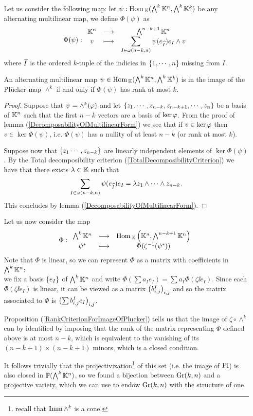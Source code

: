\noindent Let us consider the following map: let $\psi:\mathrm{Hom}\,_{\mathbb{K}}(\bigwedge^k\mathbb{K}^n,\bigwedge^k\mathbb{K}^k)$ be any alternating multilinear map, we define $\Phi(\psi)$ as
\[\Phi(\psi):\begin{array}{ccc} {\mathbb{K}^n} & \longrightarrow & {\bigwedge^{n-k+1}\mathbb{K}^n}\\ {v} & \longmapsto & {\displaystyle\sum_{I\in \omega(n-k,n)}\psi(e_{\widehat{I}})e_I\wedge v} \end{array}\]
where $\widehat{I}$ is the ordered $k$-tuple of the indicies in $\left\{{1,\cdots, n}\right\}$ missing from $I$.



\begin{proposition}\label{RankCriterionForImageOfPlucker}
An alternating multilinear map $\psi\in \mathrm{Hom}\,_{\mathbb{K}}(\bigwedge^k\mathbb{K}^n,\bigwedge^k\mathbb{K}^k)$ is in the image of the Pl\"ucker map $\wedge^k$ if and only if $\Phi(\psi)$ has rank at most $k$.
\end{proposition}
\begin{proof}
Suppose that $\psi=\wedge^k(\varphi)$ and let $\left\{{z_1,\cdots, z_{n-k},z_{n-k+1},\cdots, z_{n}}\right\}$ be a basis of $\mathbb{K}^n$ such that the first $n-k$ vectors are a basis of $\ker \varphi$. From the proof of lemma (\ref{DecomposabilityOfMultilinearForm}) we see that if $v\in \ker \varphi$ then $v\in \ker \Phi(\psi)$, i.e. $\Phi(\psi)$ has a nullity of at least $n-k$ (or rank at most $k$).
\medskip

\noindent
Suppose now that $\left\{{z_1\cdots, z_{n-k}}\right\}$ are linearly independent elements of $\ker \Phi(\psi)$. By the Total decomposibility criterion (\ref{TotalDecomposibilityCriterion}) we have that there exists $\lambda\in\mathbb{K}$ such that
\[\sum_{I\in \omega(n-k,n)}\psi(e_{\widehat{I}})e_I=\lambda z_1\wedge\cdots \wedge z_{n-k}.\]This concludes by lemma (\ref{DecomposabilityOfMultilinearForm}).
\end{proof}

\noindent Let us now consider the map
\[\Phi:\begin{array}{ccc} {\bigwedge^k\mathbb{K}^n} & \longrightarrow & { \mathrm{Hom}\,_{\mathbb{K}}\left({\mathbb{K}^n,\bigwedge^{n-k+1}\mathbb{K}^n}\right)}\\ {\psi^\ast} & \longmapsto & {\Phi(\zeta^{-1}(\psi^\ast))} \end{array}\]
Note that $\Phi$ is linear, so we can represent $\Phi$ as a matrix with coefficients in $\bigwedge^k\mathbb{K}^n$:\\
we fix a basis $\left\{{e_I}\right\}$ of $\bigwedge^k\mathbb{K}^n$ and write $\Phi(\sum a_I e_I)=\sum a_I \Phi(\zeta\ii e_I)$. Since each $\Phi(\zeta\ii e_I)$ is linear, it can be viewed as a matrix $\left({b_{i,j}^I}\right)_{i,j}$ and so the matrix associated to $\Phi$ is $\left({\sum b_{i,j}^I e_I}\right)_{i,j}$.
\bigskip

\noindent Proposition (\ref{RankCriterionForImageOfPlucker}) tells us that the image of $\zeta\circ\wedge^k$ can by identified by imposing that the rank of the matrix representing $\Phi$ defined above is at most $n-k$, which is equivalent to the vanishing of its $(n-k+1)\times (n-k+1)$ minors, which is a closed condition.

It follows trivially that the projectivization\footnote{recall that $\mathrm{Imm}\, \wedge^k$ is a cone.} of this set (i.e. the image of $\mathrm{Pl}$) is also closed in $\mathbb{P}(\bigwedge^k\mathbb{K}^n)$, so we found a bijection between $\mathrm{Gr}(k,n)$ and a projective variety, which we can use to endow $\mathrm{Gr}(k,n)$ with the structure of one.













